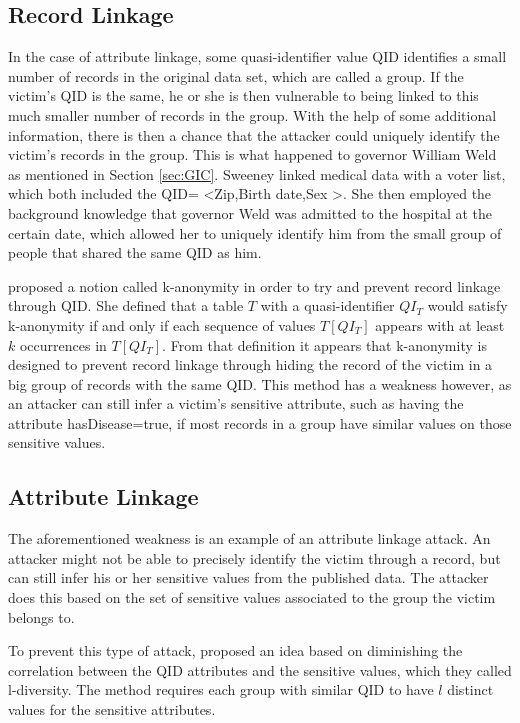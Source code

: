 \subsection{Record Linkage}
In the case of attribute linkage, some quasi-identifier value QID identifies a small number of records in the original data set, which are called a group. If the victim's QID is the same, he or she is then vulnerable to being linked to this much smaller number of records in the group. With the help of some additional information, there is then a chance that the attacker could uniquely identify the victim's records in the group. This is what happened to governor William Weld as mentioned in Section \ref{sec:GIC}. Sweeney linked medical data with a voter list, which both included the QID= \textless Zip,Birth date,Sex \textgreater. She then employed the background knowledge that governor Weld was admitted to the hospital at the certain date, which allowed her to uniquely identify him from the small group of people that shared the same QID as him. 

\cite{sweeney2002k} proposed a notion called k-anonymity in order to try and prevent record linkage through QID. She defined that a table $T$ with a quasi-identifier $QI_T$ would satisfy k-anonymity if and only if each sequence of values $T[QI_T]$ appears with at least $k$ occurrences in $T[QI_T]$. From that definition it appears that k-anonymity is designed to prevent record linkage through hiding the record of the victim in a big group of records with the same QID. This method has a weakness however, as an attacker can still infer a victim's sensitive attribute, such as having the attribute hasDisease=true, if most records in a group have similar values on those sensitive values. 

\subsection{Attribute Linkage}
The aforementioned weakness is an example of an attribute linkage attack. An attacker might not be able to precisely identify the victim through a record, but can still infer his or her sensitive values from the published data. The attacker does this based on the set of sensitive values associated to the group the victim belongs to. 

To prevent this type of attack,\cite{machanavajjhala2007diversity} proposed an idea based on diminishing the correlation between the QID attributes and the sensitive values, which they called l-diversity. The method requires each group with similar QID to have $l$ distinct values for the sensitive attributes. 


